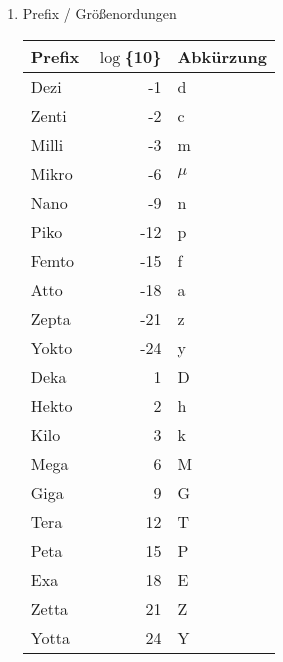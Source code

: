 \documentclass[11pt]{article}
\begin{document}
\begin{enumerate}
\item Prefix / Größenordungen
\label{sec-1-3-2-4}
\begin{center}
\begin{tabular}{lrl}
Prefix & $\log$\{10\} & Abkürzung\\
\hline
Dezi & -1 & d\\
Zenti & -2 & c\\
Milli & -3 & m\\
Mikro & -6 & $\mu$\\
Nano & -9 & n\\
Piko & -12 & p\\
Femto & -15 & f\\
Atto & -18 & a\\
Zepta & -21 & z\\
Yokto & -24 & y\\
Deka & 1 & D\\
Hekto & 2 & h\\
Kilo & 3 & k\\
Mega & 6 & M\\
Giga & 9 & G\\
Tera & 12 & T\\
Peta & 15 & P\\
Exa & 18 & E\\
Zetta & 21 & Z\\
Yotta & 24 & Y\\
\end{tabular}
\end{center}
\end{enumerate}
\end{document}
